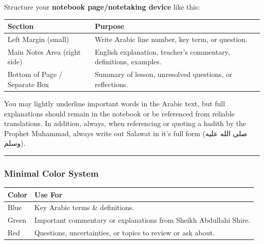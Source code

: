 \documentclass[
  a4paper,
  DIV=11,
  numbers=noendperiod]{scrartcl}
\begin{document}
Structure your \textbf{notebook page/notetaking device} like this:

\begin{longtable}[]{@{}
  >{\raggedright\arraybackslash}p{}
  >{\raggedright\arraybackslash}p{}@{}}
\toprule\noalign{}
\begin{minipage}[b]{\linewidth}\raggedright
Section
\end{minipage} & \begin{minipage}[b]{\linewidth}\raggedright
Purpose
\end{minipage} \\
\midrule\noalign{}
\endhead
\bottomrule\noalign{}
\endlastfoot
Left Margin (small) & Write Arabic line number, key term, or
question. \\
Main Notes Area (right side) & English explanation, teacher's
commentary, definitions, examples. \\
Bottom of Page / Separate Box & Summary of lesson, unresolved questions,
or reflections. \\
\end{longtable}

You may lightly underline important words in the Arabic text, but full
explanations should remain in the notebook or be referenced from
reliable translations. In addition, always, when referencing or quoting
a hadith by the Prophet Muhammad, always write out Salawat in it's full
form (صلى الله عليه وسلم).

\begin{center}\rule{0.5\linewidth}{0.5pt}\end{center}

\subsubsection{Minimal Color System}\label{minimal-color-system}

\begin{longtable}[]{@{}
  >{\raggedright\arraybackslash}p{}
  >{\raggedright\arraybackslash}p{}@{}}
\toprule\noalign{}
\begin{minipage}[b]{\linewidth}\raggedright
Color
\end{minipage} & \begin{minipage}[b]{\linewidth}\raggedright
Use For
\end{minipage} \\
\midrule\noalign{}
\endhead
\bottomrule\noalign{}
\endlastfoot
Blue & Key Arabic terms \& definitions. \\
Green & Important commentary or explanations from Sheikh Abdullahi
Shire. \\
Red & Questions, uncertainties, or topics to review or ask about. \\
\end{longtable}
\end{document}

